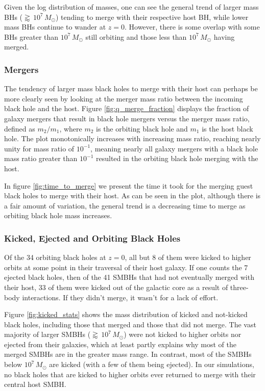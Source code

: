 \documentclass[english, apj]{emulateapj}
\begin{document}
Given the log distribution of masses, one can see the general trend of larger mass BHs ($\gtrapprox\, 10^7\, M_{\odot}$) tending to merge with their respective host BH, while lower mass BHs continue to wander at $z=0$.  However, there is some overlap with some BHs greater than $10^7\, M_{\odot}$ still orbiting and those less than $10^7\, M_{\odot}$ having merged.

\subsubsection{Mergers}\label{sec:mergers}
The tendency of larger mass black holes to merge with their host can perhaps be more clearly seen by looking at the merger mass ratio between the incoming black hole and the host.  Figure \ref{fig:q_merge_fraction} displays the fraction of galaxy mergers that result in black hole mergers versus the merger mass ratio, defined as $m_2/m_1$, where $m_2$ is the orbiting black hole and $m_1$ is the host black hole.  The plot monotonically increases with increasing mass ratio, reaching nearly unity for mass ratio of $10^{-1}$, meaning nearly all galaxy mergers with a black hole mass ratio greater than $10^{-1}$ resulted in the orbiting black hole merging with the host.

In figure \ref{fig:time_to_merge} we present the time it took for the merging guest black holes to merge with their host.  As can be seen in the plot, although there is a fair amount of variation, the general trend is a decreasing time to merge as orbiting black hole mass increases.

\subsubsection{Kicked, Ejected and Orbiting Black Holes}\label{sec:kicked_orbiting}
Of the 34 orbiting black holes at $z=0$, all but 8 of them were kicked to higher orbits at some point in their traversal of their host galaxy.  If one counts the 7 ejected black holes, then of the 41 SMBHs that had not eventually merged with their host, 33 of them were kicked out of the galactic core as a result of three-body interactions.  If they didn't merge, it wasn't for a lack of effort.

Figure \ref{fig:kicked_stats} shows the mass distribution of kicked and not-kicked black holes, including those that merged and those that did not merge.  The vast majority of larger SMBHs ($\gtrapprox\, 10^7\, M_{\odot}$) were not kicked to higher orbits nor ejected from their galaxies, which at least partly explains why most of the merged SMBHs are in the greater mass range.  In contrast, most of the SMBHs below $10^7\, M_{\odot}$ are kicked (with a few of them being ejected).  In our simulations, no black holes that are kicked to higher orbits ever returned to merge with their central host SMBH.
\end{document}
